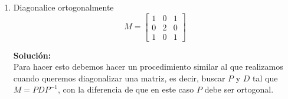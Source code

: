 \documentclass[12pt]{article}
\newenvironment{solucion}
{\begin{mdframed}[backgroundcolor=black!10]
		{\bf Solución:}\\
	}
	{
	\end{mdframed}
}
\newenvironment{preguntas}
{\begin{enumerate}\itemsep12pt
	}
	{
	\end{enumerate}
}
\newcommand{\ra}{\rightarrow}
\begin{document}
\begin{preguntas}
\begin{solucion}
\begin{itemize}
			\item $\lambda_2 = -1$
			
			$$(A+I)x = 0 \ra v_2 = \begin{pmatrix}
			1 \\ 0 \\ 0
			\end{pmatrix}, \quad
			v_2 = \begin{pmatrix}
			0 \\ 1 \\ 1
			\end{pmatrix}$$
		\end{itemize}
		Luego,
		$$A = PDP^{-1} \ra P = \begin{bmatrix}
		1 & 1 & 0 \\
		0 & 0 & 1 \\
		1 & 0 & 1
		\end{bmatrix}, \quad
		D = \begin{bmatrix}
		1 & 0 & 0 \\
		0 & -1 & 0 \\
		0 & 0 & -1
		\end{bmatrix}, \quad
		P^{-1} = \begin{bmatrix}
		0 & -1 & 1 \\
		1 & 1 & -1 \\
		0 & 1 & 0
		\end{bmatrix}$$
		Reemplacemos ahora en $B$,
		$$\begin{array}{lcl}
		B & = & A^{10} + A - I \\
		 & = & (PDP^{-1})^{10} + PDP^{-1} - I \\
		 & = & (PDP^{-1})^{10} + PDP^{-1} - PIP^{-1} \\
		B & = & P(D^{10} + D - I)P^{-1}
		\end{array}$$
		Además, sabemos que
		$$D^{10} = \begin{bmatrix}
		1^{10} & 0 & 0 \\
		0 & (-1)^{10} & 0 \\
		0 & 0 & (-1)^{10}
		\end{bmatrix}
		 = \begin{bmatrix}
		1 & 0 & 0 \\
		0 & 1 & 0 \\
		0 & 0 & 1
		\end{bmatrix} = I$$
		Por lo tanto,
		$$B = P(I + D - I)P^{-1} = PDP^{-1}$$
		Con lo que concluimos que $A=B$, por lo que la diagonalización de $A$ también es diagonalización de $B$.
\end{solucion}
\item Diagonalice ortogonalmente
	$$M = \begin{bmatrix}
	1 & 0 & 1 \\
	0 & 2 & 0 \\
	1 & 0 & 1
	\end{bmatrix}$$
\begin{solucion}
Para hacer esto debemos hacer un procedimiento similar al que realizamos cuando queremos diagonalizar una matriz, es decir, buscar $P$ y $D$ tal que $M = PDP^{-1}$, con la diferencia de que en este caso $P$ debe ser ortogonal.
		

\end{solucion}
\end{preguntas}
\end{document}
